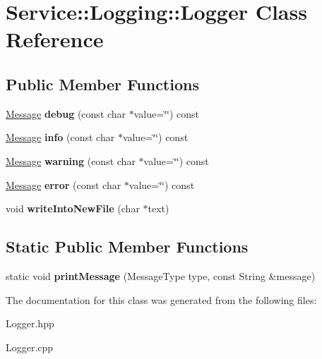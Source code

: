 \hypertarget{classService_1_1Logging_1_1Logger}{}\section{Service\+:\+:Logging\+:\+:Logger Class Reference}
\label{classService_1_1Logging_1_1Logger}
\subsection*{Public Member Functions}
\begin{DoxyCompactItemize}
\item 
\mbox{\label{classService_1_1Logging_1_1Logger_aa1048fbf4252289f905dfce24f61b3a0}} 
\mbox{\hyperlink{classService_1_1Logging_1_1Message}{Message}} {\bfseries debug} (const char $\ast$value=\char`\"{}\char`\"{}) const
\item 
\mbox{\label{classService_1_1Logging_1_1Logger_adbbd1ab301b880148d06438ea8d50c9b}} 
\mbox{\hyperlink{classService_1_1Logging_1_1Message}{Message}} {\bfseries info} (const char $\ast$value=\char`\"{}\char`\"{}) const
\item 
\mbox{\label{classService_1_1Logging_1_1Logger_a25ef306bca6bcfee3ad6859da015f31a}} 
\mbox{\hyperlink{classService_1_1Logging_1_1Message}{Message}} {\bfseries warning} (const char $\ast$value=\char`\"{}\char`\"{}) const
\item 
\mbox{\label{classService_1_1Logging_1_1Logger_a909703a09e82c07a9b7218609293bded}} 
\mbox{\hyperlink{classService_1_1Logging_1_1Message}{Message}} {\bfseries error} (const char $\ast$value=\char`\"{}\char`\"{}) const
\item 
\mbox{\label{classService_1_1Logging_1_1Logger_a28c22cbd62feb56a1caa4a5d81e13162}} 
void {\bfseries write\+Into\+New\+File} (char $\ast$text)
\end{DoxyCompactItemize}
\subsection*{Static Public Member Functions}
\begin{DoxyCompactItemize}
\item 
\mbox{\label{classService_1_1Logging_1_1Logger_a63ca87ca5d932063325d94e2b4085443}} 
static void {\bfseries print\+Message} (Message\+Type type, const String \&message)
\end{DoxyCompactItemize}


The documentation for this class was generated from the following files\+:\begin{DoxyCompactItemize}
\item 
Logger.\+hpp\item 
Logger.\+cpp\end{DoxyCompactItemize}
